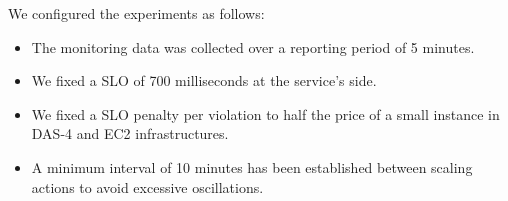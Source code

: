  







We configured the experiments as follows:


\begin{itemize}

\item The monitoring data was collected over a reporting period of 5 minutes.

\item We fixed a SLO of 700 milliseconds at the service's side.

\item We fixed a SLO penalty per violation to half the price of a small instance in DAS-4 and EC2 infrastructures.


\item A minimum interval of 10 minutes has been established between scaling actions to avoid excessive oscillations. 
\end{itemize}




